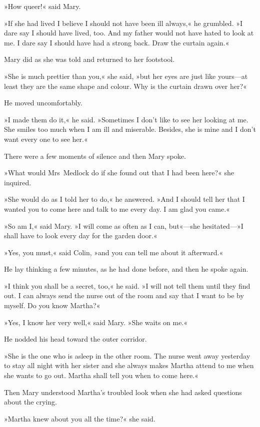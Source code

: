 »How queer!« said Mary.

»If she had lived I believe I should not have been ill always,« he grumbled. »I dare say I should have lived, too. And my father would not have hated to look at me. I dare say I should have had a strong back. Draw the curtain again.«

Mary did as she was told and returned to her footstool.

»She is much prettier than you,« she said, »but her eyes are just like yours—at least they are the same shape and colour. Why is the curtain drawn over her?«

He moved uncomfortably.

»I made them do it,« he said. »Sometimes I don't like to see her looking at me. She smiles too much when I am ill and miserable. Besides, she is mine and I don't want every one to see her.«

There were a few moments of silence and then Mary spoke.

»What would Mrs~Medlock do if she found out that I had been here?« she inquired.

»She would do as I told her to do,« he answered. »And I should tell her that I wanted you to come here and talk to me every day. I am glad you came.«

»So am I,« said Mary. »I will come as often as I can, but«—she hesitated—»I shall have to look every day for the garden door.«

»Yes, you must,« said Colin, »and you can tell me about it afterward.«

He lay thinking a few minutes, as he had done before, and then he spoke again.

»I think you shall be a secret, too,« he said. »I will not tell them until they find out. I can always send the nurse out of the room and say that I want to be by myself. Do you know Martha?«

»Yes, I know her very well,« said Mary. »She waits on me.«

He nodded his head toward the outer corridor.

»She is the one who is asleep in the other room. The nurse went away yesterday to stay all night with her sister and she always makes Martha attend to me when she wants to go out. Martha shall tell you when to come here.«

Then Mary understood Martha's troubled look when she had asked questions about the crying.

»Martha knew about you all the time?« she said.

